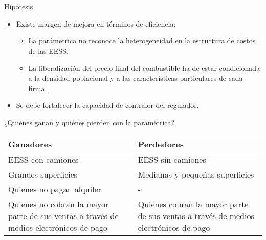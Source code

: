 \documentclass[10pt]{beamer}
\begin{document}
\begin{frame}{Hipótesis}
\begin{itemize}
\item Existe margen de mejora en términos de eficiencia:
	\begin{itemize}
	\item La parámetrica no reconoce la heterogeneidad en la estructura de costos de las EESS.
	\item La liberalización del precio final del combustible ha de estar condicionada a la densidad poblacional y a las características particulares de cada firma.
	\end{itemize}
\item Se debe fortalecer la capacidad de contralor del regulador.
\end{itemize}


\end{frame}


\begin{frame}{¿Quiénes ganan y quiénes pierden con la paramétrica?}

\begin{center}
\begin{tabular}{| >{\centering\arraybackslash} m{5cm} | >{\centering\arraybackslash} m{5cm} |}
	\hline
	\textbf{Ganadores} & \textbf{Perdedores} \\
	\hline
	EESS con camiones & EESS sin camiones \\
	\hline
	Grandes superficies & Medianas y pequeñas superficies \\
	\hline
	Quienes no pagan alquiler & - \\
	\hline
	Quienes no cobran la mayor parte de sus ventas a través de medios electrónicos de pago & Quienes cobran la mayor parte de sus ventas a través de medios electrónicos de pago \\
	\hline
\end{tabular}
\end{center}

\end{frame}
\end{document}
